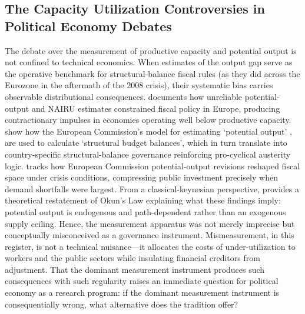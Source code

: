 \documentclass[11pt,a4paper]{article}
\begin{document}
\subsection{The Capacity Utilization Controversies in Political Economy Debates}
\label{sec:2.3}


The debate over the measurement of productive capacity and potential output is not confined to technical economics. When estimates of the output gap serve as the operative benchmark for structural-balance fiscal rules (as they did across the Eurozone in the aftermath of the 2008 crisis), their systematic bias carries observable distributional consequences. \citet{Klar2013} documents how unreliable potential-output and NAIRU estimates constrained fiscal policy in Europe, producing contractionary impulses in economies operating well below productive capacity. \citet{Heimberger2017} show how the European Commission’s model for estimating ‘potential output’ \citep{HavikEtAl2014}, are used to calculate ‘structural budget balances’, which in turn translate into country-specific  structural-balance governance reinforcing pro-cyclical austerity logic. \citet{Heimberger2020} tracks how European Commission
potential-output revisions reshaped fiscal space under crisis conditions, compressing public investment precisely when demand shortfalls were largest. From a classical-keynesian perspective, \citet{Palumbo2015} provides a theoretical restatement of Okun's Law explaining what these findings imply: potential output is endogenous and path-dependent rather than an exogenous supply ceiling. Hence, the measurement apparatus was not merely imprecise but
conceptually misconceived as a governance instrument. Mismeasurement, in this register, is not a technical nuisance---it allocates the costs of under-utilization to workers and the public sectors while insulating financial creditors from adjustment. That the dominant measurement instrument produces such consequences with such regularity raises an immediate question for political economy as a research program: if the dominant measurement instrument is consequentially wrong, what alternative does the tradition offer?
\end{document}
